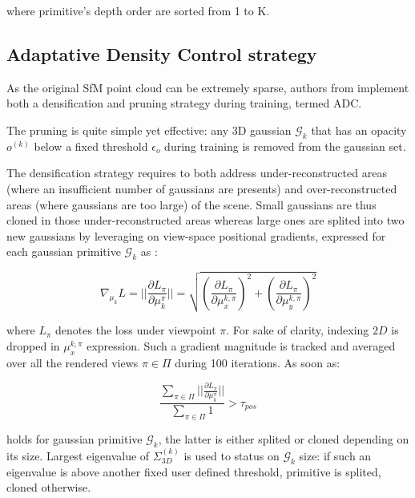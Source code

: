 where primitive’s depth order are sorted from 1 to K. \newline

\subsection{Adaptative Density Control strategy} 
As the original \ac{SfM} point cloud can be extremely sparse, authors from \citep{kerbl20233d} implement both a densification and pruning strategy during training, termed \ac{ADC}. 

The pruning is quite simple yet effective: any 3D gaussian $\mathcal{G}_{k}$ that has an opacity $o^{(k)}$ below a fixed threshold $\epsilon_{o}$ during training is removed from the gaussian set. 

The densification strategy requires to both address under-reconstructed areas (where an insufficient number of gaussians are presents) and over-reconstructed areas (where gaussians are too large) of the scene. Small gaussians are thus cloned in those under-reconstructed areas whereas large ones are splited into two new gaussians by leveraging on view-space positional gradients, expressed for each gaussian primitive $\mathcal{G}_{k}$ as : 

\begin{equation}
   \nabla_{\mu_{k}}L= ||\frac{\partial L_{\pi}}{\partial \mu_{k}^{\pi}}|| = \sqrt{\left(\frac{\partial L_{\pi}}{\partial \mu_{x}^{k,\pi}}\right)^{2} + \left(\frac{\partial L_{\pi}}{\partial \mu_{y}^{k,\pi}}\right)^{2}}
\end{equation}

where $L_{\pi}$ denotes the loss under viewpoint $\pi$. For sake of clarity, indexing $2D$ is dropped in $\mu_{x}^{k,\pi}$ expression. Such a gradient magnitude is tracked and averaged over all the rendered views $\pi \in \Pi$ during 100 iterations. As soon as: 

\begin{equation}
\frac{\sum \limits_{\pi \in \Pi} ||\frac{\partial L_{\pi}}{\partial \mu_{k}^{\pi}}||}{\sum \limits_{\pi \in \Pi} 1} > \tau_{pos}
\label{eq:adc-original}
\end{equation}

holds for gaussian primitive $\mathcal{G}_{k}$, the latter is either splited or cloned depending on its size. Largest eigenvalue of $\Sigma^{(k)}_{3D}$ is used to status on $\mathcal{G}_{k}$ size: if such an eigenvalue is above another fixed user defined threshold, primitive is splited, cloned otherwise. \newline

